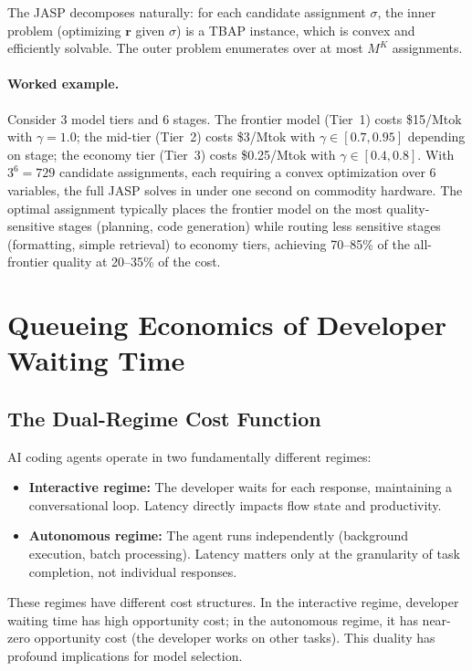 \documentclass[11pt, a4paper, copyright]{googledeepmind}
\begin{document}
The JASP decomposes naturally: for each candidate assignment $\sigma$, the inner problem (optimizing $\mathbf{r}$ given $\sigma$) is a TBAP instance, which is convex and efficiently solvable. The outer problem enumerates over at most $M^K$ assignments.

\paragraph{Worked example.}
Consider 3 model tiers and 6 stages. The frontier model (Tier~1) costs \$15/Mtok with $\gamma = 1.0$; the mid-tier (Tier~2) costs \$3/Mtok with $\gamma \in [0.7, 0.95]$ depending on stage; the economy tier (Tier~3) costs \$0.25/Mtok with $\gamma \in [0.4, 0.8]$. With $3^6 = 729$ candidate assignments, each requiring a convex optimization over 6 variables, the full JASP solves in under one second on commodity hardware. The optimal assignment typically places the frontier model on the most quality-sensitive stages (planning, code generation) while routing less sensitive stages (formatting, simple retrieval) to economy tiers, achieving 70--85\% of the all-frontier quality at 20--35\% of the cost.


\section{Queueing Economics of Developer Waiting Time}\label{sec:queueing}

\subsection{The Dual-Regime Cost Function}

AI coding agents operate in two fundamentally different regimes:
\begin{itemize}[nosep]
    \item \textbf{Interactive regime:} The developer waits for each response, maintaining a conversational loop. Latency directly impacts flow state and productivity.
    \item \textbf{Autonomous regime:} The agent runs independently (background execution, batch processing). Latency matters only at the granularity of task completion, not individual responses.
\end{itemize}

These regimes have different cost structures. In the interactive regime, developer waiting time has high opportunity cost; in the autonomous regime, it has near-zero opportunity cost (the developer works on other tasks). This duality has profound implications for model selection.
\end{document}
